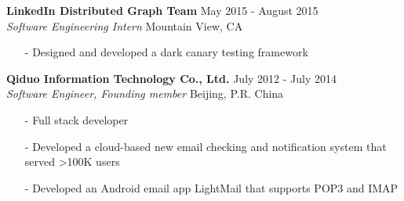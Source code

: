 \documentclass[mm, 7pt]{resume} %
\begin{document}
\begin{resume}
\textbf{LinkedIn Distributed Graph Team} \hfill May 2015 - August 2015 \\
{\sl Software Engineering Intern}  \hfill Mountain View, CA
\begin{itemize} \itemsep -2pt
\item[-] Designed and developed a dark canary testing framework
\end{itemize}

\textbf{Qiduo Information Technology Co., Ltd.}  \hfill  July 2012 - July 2014 \\
{\sl Software Engineer, Founding member}                          \hfill  Beijing, P.R. China
\begin{itemize} \itemsep -2pt
\item[-] Full stack developer
\item[-] Developed a cloud-based new email checking and notification system that served >100K users
\item[-] Developed an Android email app LightMail that supports POP3 and IMAP
\end{itemize}



\end{resume}
\end{document}
